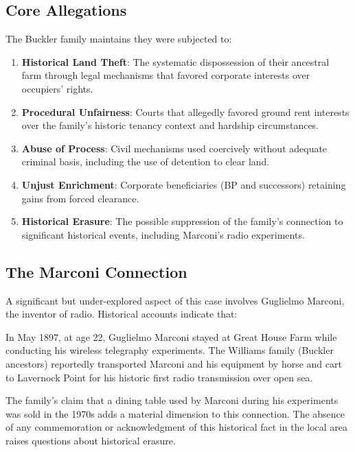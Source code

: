 \documentclass[11pt,a4paper]{article}
\begin{document}
\subsection{Core Allegations}

The Buckler family maintains they were subjected to:

\begin{enumerate}[label=\arabic*.]
    \item \textbf{Historical Land Theft}: The systematic dispossession of their ancestral farm through legal mechanisms that favored corporate interests over occupiers' rights.
    \item \textbf{Procedural Unfairness}: Courts that allegedly favored ground rent interests over the family's historic tenancy context and hardship circumstances.
    \item \textbf{Abuse of Process}: Civil mechanisms used coercively without adequate criminal basis, including the use of detention to clear land.
    \item \textbf{Unjust Enrichment}: Corporate beneficiaries (BP and successors) retaining gains from forced clearance.
    \item \textbf{Historical Erasure}: The possible suppression of the family's connection to significant historical events, including Marconi's radio experiments.
\end{enumerate}

\subsection{The Marconi Connection}

A significant but under-explored aspect of this case involves Guglielmo Marconi, the inventor of radio. Historical accounts indicate that:

\begin{timeline}
In May 1897, at age 22, Guglielmo Marconi stayed at Great House Farm while conducting his wireless telegraphy experiments. The Williams family (Buckler ancestors) reportedly transported Marconi and his equipment by horse and cart to Lavernock Point for his historic first radio transmission over open sea.
\end{timeline}

The family's claim that a dining table used by Marconi during his experiments was sold in the 1970s adds a material dimension to this connection. The absence of any commemoration or acknowledgment of this historical fact in the local area raises questions about historical erasure.
\end{document}
